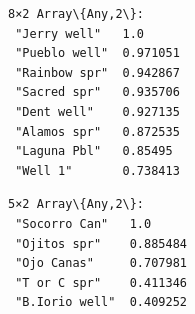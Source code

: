 \documentclass[11pt]{article}
\begin{document}
    \begin{Verbatim}[commandchars=\\\{\}]
8×2 Array\{Any,2\}:
 "Jerry well"   1.0
 "Pueblo well"  0.971051
 "Rainbow spr"  0.942867
 "Sacred spr"   0.935706
 "Dent well"    0.927135
 "Alamos spr"   0.872535
 "Laguna Pbl"   0.85495
 "Well 1"       0.738413
    \end{Verbatim}

    
    
    \begin{Verbatim}[commandchars=\\\{\}]
5×2 Array\{Any,2\}:
 "Socorro Can"   1.0
 "Ojitos spr"    0.885484
 "Ojo Canas"     0.707981
 "T or C spr"    0.411346
 "B.Iorio well"  0.409252
    \end{Verbatim}

    
    \begin{center}
    \end{center}
    { \hspace*{\fill} \\}
    
\end{document}
